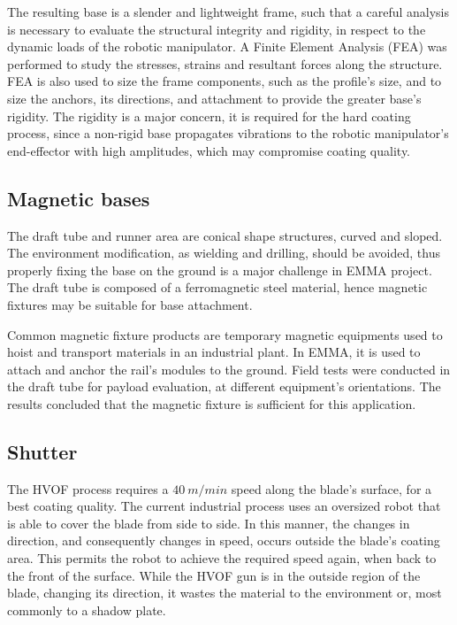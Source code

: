 The resulting base is a slender and lightweight frame, such that a careful
analysis is necessary to evaluate the structural integrity and rigidity, in
respect to the dynamic loads of the robotic manipulator. A Finite Element
Analysis (FEA) was performed to study the stresses, strains and resultant forces
along the structure. FEA is also used to size the frame components, such as
the profile's size, and to size the anchors, its directions, and attachment to
provide the greater base's rigidity. The rigidity is a major concern, it is
required for the hard coating process, since a non-rigid base propagates
vibrations to the robotic manipulator's end-effector with high amplitudes, which
may compromise coating quality.


\subsection{Magnetic bases}

The draft tube and runner area are conical shape structures, curved and
sloped. The environment modification, as wielding and drilling, should be
avoided, thus properly fixing the base on the ground is a major challenge in
EMMA project. The draft tube is composed of a ferromagnetic steel material,
hence magnetic fixtures may be suitable for base attachment. 

Common magnetic fixture products are temporary magnetic equipments used to hoist
and transport materials in an industrial plant. In EMMA, it is used to attach
and anchor the rail's modules to the ground. Field tests were conducted in the
draft tube for payload evaluation, at different equipment's orientations. The
results concluded that the magnetic fixture is sufficient for this application.


\subsection{Shutter}

The HVOF process requires a $40~m/min$ speed along the blade's surface, for a
best coating quality. 
The current industrial process uses an oversized robot that is able to
cover the blade from side to side. In this manner, the changes in direction, and
consequently changes in speed, occurs outside the blade's coating area.
This permits the robot to achieve the required speed again, when back to the
front of the surface.
While the HVOF gun is in the outside region of the blade, changing its
direction, it wastes the material to the environment or, most commonly to a
shadow plate.

